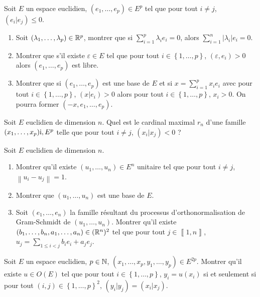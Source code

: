 \documentclass[12pt]{article}
\begin{document}
\begin{exercise}
	Soit $E$ un espace euclidien, $(e_1,\dots,e_p)\in E^{p}$ tel que pour tout $i\neq j$, $(e_i|e_j)\leqslant0$.
	\begin{enumerate}
		\item Soit $(\lambda_1,\dots,\lambda_p)\in\mathbb{R}^{p}$, montrer que si $\sum_{i=1}^{p}\lambda_i e_i=0$, alors $\sum_{i=1}^{n}\left\lvert \lambda_i\right\rvert e_i=0$.
		\item Montrer que s'il existe $\varepsilon\in E$ tel que pour tout $i\in\left\lbrace1,\dots,p\right\rbrace$, $(\varepsilon,e_i)>0$ alors $(e_1,\dots,e_p)$ est libre.
		\item Montrer que si $(e_1,\dots,e_p)$ est une base de $E$ et si $x=\sum_{i=1}^{p}x_i e_i$ avec pour  tout $i\in\left\lbrace1,\dots,p\right\rbrace$, $(x|e_i)>0$ alors pour tout $i\in\left\lbrace1,\dots,p\right\rbrace$, $x_i>0$. On pourra former $(-x, e_1,\dots, e_p)$.
	\end{enumerate}
\end{exercise}

\begin{exercise}
	Soit $E$ euclidien de dimension $n$. Quel est le cardinal maximal $r_n$ d'une famille $(x_1,\dots,x_p)\mathrm{i}, E^{p}$ telle que pour tout $i\neq j$, $(x_i|x_j)<0$ ?
\end{exercise}

\begin{exercise}
	Soit $E$ euclidien de dimension $n$.
	\begin{enumerate}
		\item Montrer qu'il existe $(u_1,\dots,u_n)\in E^{n}$ unitaire tel que pour tout $i\neq j$, $\left\lVert u_i-u_j\right\rVert=1$.
		\item Montrer que $(u_1,\dots,u_n)$ est une base de $E$.
		\item Soit $(e_1,\dots,e_n)$ la famille résultant du processus d'orthonormalisation de Gram-Schmidt de $(u_1,\dots,u_n)$. Montrer qu'il existe $(b_1,\dots,b_n,a_1,\dots,a_n)\in(\mathbb{R}^{n})^{2}$ tel que pour tout $j\in\left\llbracket1,n\right\rrbracket$, $u_j=\sum_{1\leqslant i<j}b_{i}e_i+a_{j}e_j$.
	\end{enumerate}
\end{exercise}

\begin{exercise}
	Soit $E$ un espace euclidien, $p\in\mathbb{N}$, $(x_1,\dots,x_p,y_1,\dots,y_p)\in E^{2p}$. Montrer qu'il existe $u\in O(E)$ tel que pour tout $i\in\left\lbrace1,\dots,p\right\rbrace$, $y_i=u(x_i)$ si et seulement si pour tout $(i,j)\in\left\lbrace1,\dots,p\right\rbrace^{2}$, $(y_i|y_j)=(x_i|x_j)$.
\end{exercise}
\end{document}
